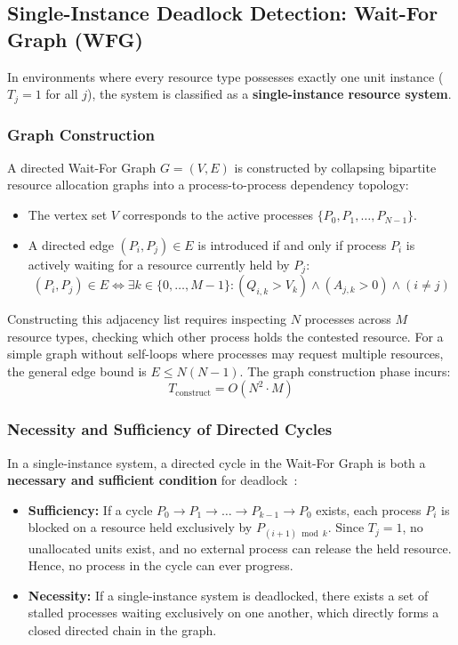 \documentclass[11pt,a4paper]{article}
\begin{document}
\subsection{Single-Instance Deadlock Detection: Wait-For Graph (WFG)}
In environments where every resource type possesses exactly one unit instance ($T_j = 1$ for all $j$), the system is classified as a \textbf{single-instance resource system}.

\subsubsection{Graph Construction}
A directed Wait-For Graph $G = (V, E)$ is constructed by collapsing bipartite resource allocation graphs into a process-to-process dependency topology:
\begin{itemize}
    \item The vertex set $V$ corresponds to the active processes $\{P_0, P_1, \dots, P_{N-1}\}$.
    \item A directed edge $(P_i, P_j) \in E$ is introduced if and only if process $P_i$ is actively waiting for a resource currently held by $P_j$:
    \begin{equation}
        (P_i, P_j) \in E \iff \exists k \in \{0, \dots, M-1\} : (Q_{i,k} > V_k) \wedge (A_{j,k} > 0) \wedge (i \neq j)
    \end{equation}
\end{itemize}
Constructing this adjacency list requires inspecting $N$ processes across $M$ resource types, checking which other process holds the contested resource. For a simple graph without self-loops where processes may request multiple resources, the general edge bound is $E \le N(N - 1)$. The graph construction phase incurs:
\begin{equation}
    T_{\text{construct}} = O(N^2 \cdot M)
\end{equation}

\subsubsection{Necessity and Sufficiency of Directed Cycles}
In a single-instance system, a directed cycle in the Wait-For Graph is both a \textbf{necessary and sufficient condition} for deadlock~\cite{silberschatz2018operating}:
\begin{itemize}
    \item \textbf{Sufficiency:} If a cycle $P_0 \to P_1 \to \dots \to P_{k-1} \to P_0$ exists, each process $P_i$ is blocked on a resource held exclusively by $P_{(i+1)\bmod k}$. Since $T_j = 1$, no unallocated units exist, and no external process can release the held resource. Hence, no process in the cycle can ever progress.
    \item \textbf{Necessity:} If a single-instance system is deadlocked, there exists a set of stalled processes waiting exclusively on one another, which directly forms a closed directed chain in the graph.
\end{itemize}
\end{document}
